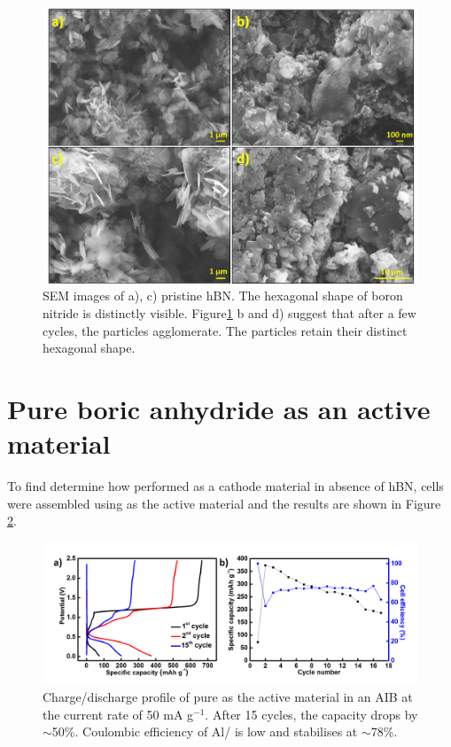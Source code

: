 \begin{figure}[tbh!]
\centering
\includegraphics[width=\textwidth]{Figures/BOhBN/hBNSEM}
\caption{SEM images of a), c) pristine hBN. The hexagonal shape of boron nitride is distinctly visible. Figure\ref{Figures/BOhBN:hBNSEM} b and d) suggest that after a few cycles, the particles agglomerate. The particles retain their distinct hexagonal shape.}
\label{Figures/BOhBN:hBNSEM}
\end{figure}



\section*{Pure boric anhydride  as an active material}
To find determine how  performed as a cathode material in absence of hBN, cells were assembled using  as the active material and the results are shown in Figure \ref{Figures/BOhBN:BOCDC}. 

\begin{figure}[tbh!]
\centering
\includegraphics[width=\textwidth]{Figures/BOhBN/BOCDC}
\caption{Charge/discharge profile of pure  as the active material in an AIB at the current rate of 50 mA g$^{-1}$. After 15 cycles, the capacity drops by $\sim$50\%. Coulombic efficiency of Al/ is low and  stabilises at $\sim$78\%.}
\label{Figures/BOhBN:BOCDC}
\end{figure}

